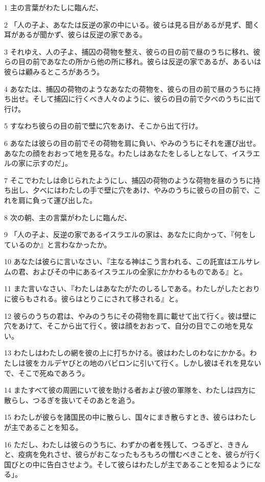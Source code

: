 \par 1 主の言葉がわたしに臨んだ、
\par 2 「人の子よ、あなたは反逆の家の中にいる。彼らは見る目があるが見ず、聞く耳があるが聞かず、彼らは反逆の家である。
\par 3 それゆえ、人の子よ、捕囚の荷物を整え、彼らの目の前で昼のうちに移れ、彼らの目の前であなたの所から他の所に移れ。彼らは反逆の家であるが、あるいは彼らは顧みるところがあろう。
\par 4 あなたは、捕囚の荷物のようなあなたの荷物を、彼らの目の前で昼のうちに持ち出せ。そして捕囚に行くべき人々のように、彼らの目の前で夕べのうちに出て行け。
\par 5 すなわち彼らの目の前で壁に穴をあけ、そこから出て行け。
\par 6 あなたは彼らの目の前でその荷物を肩に負い、やみのうちにそれを運び出せ。あなたの顔をおおって地を見るな。わたしはあなたをしるしとなして、イスラエルの家に示すのだ」。
\par 7 そこでわたしは命じられたようにし、捕囚の荷物のような荷物を昼のうちに持ち出し、夕べにはわたしの手で壁に穴をあけ、やみのうちに彼らの目の前で、これを肩に負って運び出した。
\par 8 次の朝、主の言葉がわたしに臨んだ、
\par 9 「人の子よ、反逆の家であるイスラエルの家は、あなたに向かって、『何をしているのか』と言わなかったか。
\par 10 あなたは彼らに言いなさい、『主なる神はこう言われる、この託宣はエルサレムの君、およびその中にあるイスラエルの全家にかかわるものである』と。
\par 11 また言いなさい、『わたしはあなたがたのしるしである。わたしがしたとおりに彼らもされる。彼らはとりこにされて移される』と。
\par 12 彼らのうちの君は、やみのうちにその荷物を肩に載せて出て行く。彼は壁に穴をあけて、そこから出て行く。彼は顔をおおって、自分の目でこの地を見ない。
\par 13 わたしはわたしの網を彼の上に打ちかける。彼はわたしのわなにかかる。わたしは彼をカルデヤびとの地のバビロンに引いて行く。しかし彼はそれを見ないで、そこで死ぬであろう。
\par 14 またすべて彼の周囲にいて彼を助ける者および彼の軍隊を、わたしは四方に散らし、つるぎを抜いてそのあとを追う。
\par 15 わたしが彼らを諸国民の中に散らし、国々にまき散らすとき、彼らはわたしが主であることを知る。
\par 16 ただし、わたしは彼らのうちに、わずかの者を残して、つるぎと、ききんと、疫病を免れさせ、彼らがおこなったもろもろの憎むべきことを、彼らが行く国びとの中に告白させよう。そして彼らはわたしが主であることを知るようになる」。
